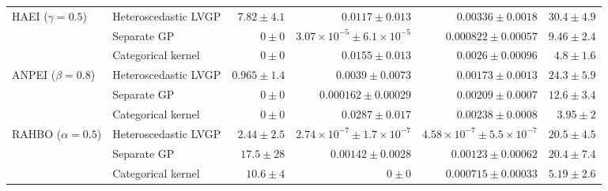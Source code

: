 \begin{table}[htbp]
\begin{tabular}{llrrrr}
\midrule
HAEI ($\gamma=0.5$) & Heteroscedastic LVGP & $7.82 \pm 4.1$ & $0.0117 \pm 0.013$ & $0.00336 \pm 0.0018$ & $30.4 \pm 4.9$ \\
 & Separate GP & \colorbox{green!20}{{\boldmath$0 \pm 0$}} & {\boldmath$3.07{\times}10^{-5} \pm 6.1{\times}10^{-5}$} & {\boldmath$0.000822 \pm 0.00057$} & $9.46 \pm 2.4$ \\
 & Categorical kernel & \colorbox{green!20}{{\boldmath$0 \pm 0$}} & $0.0155 \pm 0.013$ & $0.0026 \pm 0.00096$ & {\boldmath$4.8 \pm 1.6$} \\
\midrule
ANPEI ($\beta=0.8$) & Heteroscedastic LVGP & $0.965 \pm 1.4$ & $0.0039 \pm 0.0073$ & {\boldmath$0.00173 \pm 0.0013$} & $24.3 \pm 5.9$ \\
 & Separate GP & \colorbox{green!20}{{\boldmath$0 \pm 0$}} & {\boldmath$0.000162 \pm 0.00029$} & $0.00209 \pm 0.0007$ & $12.6 \pm 3.4$ \\
 & Categorical kernel & \colorbox{green!20}{{\boldmath$0 \pm 0$}} & $0.0287 \pm 0.017$ & $0.00238 \pm 0.0008$ & {\boldmath$3.95 \pm 2$} \\
\midrule
RAHBO ($\alpha=0.5$) & Heteroscedastic LVGP & {\boldmath$2.44 \pm 2.5$} & $2.74{\times}10^{-7} \pm 1.7{\times}10^{-7}$ & {\boldmath$4.58{\times}10^{-7} \pm 5.5{\times}10^{-7}$} & $20.5 \pm 4.5$ \\
 & Separate GP & $17.5 \pm 28$ & $0.00142 \pm 0.0028$ & $0.00123 \pm 0.00062$ & $20.4 \pm 7.4$ \\
 & Categorical kernel & $10.6 \pm 4$ & \colorbox{green!20}{{\boldmath$0 \pm 0$}} & $0.000715 \pm 0.00033$ & {\boldmath$5.19 \pm 2.6$} \\
\bottomrule
\end{tabular}
\end{table}
